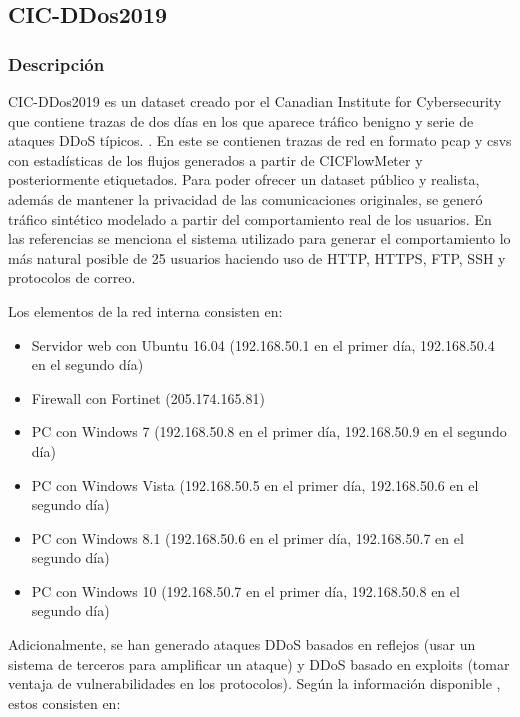 \subsection{CIC-DDos2019}

\subsubsection{Descripción}

CIC-DDos2019 es un dataset creado por el Canadian Institute for Cybersecurity que contiene trazas de dos días en los que aparece tráfico benigno y serie de ataques DDoS típicos. \cite{cicddos2019web}. En este se contienen trazas de red en formato pcap y csvs con estadísticas de los flujos generados a partir de CICFlowMeter y posteriormente etiquetados. Para poder ofrecer un dataset público y realista, además de mantener la privacidad de las comunicaciones originales, se generó tráfico sintético modelado a partir del comportamiento real de los usuarios. En las referencias se menciona el sistema utilizado para generar el comportamiento lo más natural posible de 25 usuarios haciendo uso de HTTP, HTTPS, FTP, SSH y protocolos de correo.

Los elementos de la red interna consisten en:

\begin{itemize}
    \item Servidor web con Ubuntu 16.04 (192.168.50.1 en el primer día, 192.168.50.4 en el segundo día)
    \item Firewall con Fortinet (205.174.165.81)
    \item PC con Windows 7 (192.168.50.8 en el primer día, 192.168.50.9 en el segundo día)
    \item PC con Windows Vista (192.168.50.5 en el primer día, 192.168.50.6 en el segundo día)
    \item PC con Windows 8.1 (192.168.50.6 en el primer día, 192.168.50.7 en el segundo día)
    \item PC con Windows 10 (192.168.50.7 en el primer día, 192.168.50.8 en el segundo día)
\end{itemize}

Adicionalmente, se han generado ataques DDoS basados en reflejos (usar un sistema de terceros para amplificar un ataque) y DDoS basado en exploits (tomar ventaja de vulnerabilidades en los protocolos). Según la información disponible \cite{cicddos2019web}, estos consisten en:

